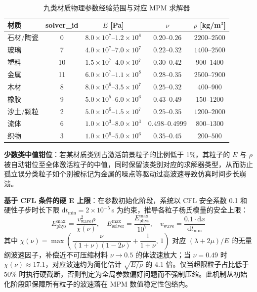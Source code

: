 \begin{table}[!htbp]
\centering
\caption{九类材质物理参数经验范围与对应 MPM 求解器}
\label{tab:material_params}
\begin{tabular}{lcccc}
\hline
材质 & solver\_id & $E$ [Pa] & $\nu$ & $\rho$ [kg/m$^3$] \\
\hline
石材/陶瓷 & 0 & $8.0\times10^7$--$1.2\times10^8$ & $0.20$--$0.26$ & $2200$--$2500$ \\
玻璃 & 7 & $4.0\times10^7$--$7.0\times10^7$ & $0.22$--$0.32$ & $1400$--$2500$ \\
塑料 & 10 & $1.5\times10^7$--$4.0\times10^7$ & $0.30$--$0.42$ & $900$--$1400$ \\
金属 & 11 & $6.0\times10^7$--$1.1\times10^8$ & $0.28$--$0.35$ & $2500$--$7900$ \\
木材 & 8 & $8.0\times10^6$--$3.5\times10^7$ & $0.25$--$0.32$ & $400$--$900$ \\
橡胶 & 9 & $5.0\times10^5$--$6.0\times10^6$ & $0.43$--$0.49$ & $150$--$1200$ \\
沙土/颗粒 & 2 & $5.0\times10^6$--$1.5\times10^7$ & $0.25$--$0.35$ & $1200$--$2000$ \\
流体 & 6 & $1.0\times10^3$--$8.0\times10^3$ & $0.498$--$0.4999$ & $800$--$1300$ \\
织物 & 3 & $1.0\times10^6$--$5.0\times10^6$ & $0.35$--$0.45$ & $200$--$500$ \\
\hline
\end{tabular}
\end{table}

\textbf{少数类中值钳位}：若某材质类别占激活前景粒子的比例低于 1\%，其粒子的 $E$ 与 $\rho$ 被自动钳位至全体激活粒子的中值，同时保留该类别对应的求解器类型，从而防止孤立误分类粒子如个别被标记为金属的噪点等驱动过高波速导致仿真时间步长崩溃。

\textbf{基于 CFL 条件的硬 E 上限}：在参数初始化阶段，系统以 CFL 安全系数 0.1 和硬性子步时长下限 $\mathrm{d}t_{\min}=2\times10^{-5}$\,s 为约束，推导各粒子杨氏模量的安全上限：
\begin{equation}
E_{\text{phys}}^{\max}=\dfrac{v_{\text{wave}}^2\rho}{\chi(\nu)},\quad
E_{\text{solver}}^{\max}=\dfrac{E_{\text{phys}}^{\max}}{10^7},\quad
v_{\text{wave}}=\dfrac{0.1\cdot\mathrm{d}x}{\mathrm{d}t_{\min}}
\label{eq:cfl_initial_e_cap}
\end{equation}
其中 $\chi(\nu)=\max\left(\dfrac{\nu}{(1+\nu)(1-2\nu)}+\dfrac{1}{1+\nu},\,1\right)$ 对应 $(\lambda+2\mu)/E$ 的无量纲波速因子，补偿近不可压缩材料 $\nu\to0.5$ 的体波速放大；当 $\nu=0.49$ 时 $\chi(\nu)\approx17.1$，对应波速约为简化估计 $\sqrt{E/\rho}$ 的 4.1 倍。仅当超限粒子占比低于 50\% 时执行硬截断，否则判定为全局参数偏好问题而不强制压缩。此机制从初始化阶段即保障所有粒子的波速落在 MPM 数值稳定性包络内。

